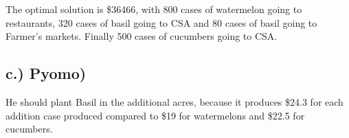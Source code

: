 \documentclass{report}
\begin{document}
 The optimal solution is \$36466, with 800 cases of watermelon going to restaurants, 320 cases of basil going to CSA and 80 cases of basil going to Farmer's markets. Finally 500 cases of cucumbers going to CSA.  

 \subsection*{c.) Pyomo)}

He should plant Basil in the additional acres, because it produces \$24.3 for each addition case produced compared to \$19 for watermelons and \$22.5 for cucumbers.
\end{document}
